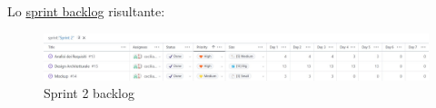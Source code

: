 Lo \href{https://github.com/orgs/ISIQuiz/projects/3/views/13}{sprint backlog} risultante:
\begin{figure}[H]
    \centering
    \includegraphics[width=\textwidth]{process/Img/Sprint2BL.jpg}
    \caption{Sprint 2 backlog}
    \label{fig:Sprint2}
\end{figure}

